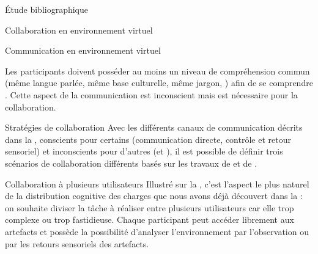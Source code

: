 \documentclass[myfrancais,ngerman,english,french]{mythesis}
\begin{document}
\begin{mychapter}{Étude bibliographique}
\begin{mysection}{Collaboration en environnement virtuel}
\begin{mysubsection}{Communication en environnement virtuel}
				\begin{mysubsubsection}{\myGrounding}
					Les participants doivent posséder au moins un niveau de compréhension commun (même langue parlée, même base culturelle, même jargon, \myetc) afin de se comprendre .
					Cette aspect de la communication est inconscient mais est nécessaire pour la collaboration.
				\end{mysubsubsection}
			\end{mysubsection}
			\begin{mysubsection}{Stratégies de collaboration}
				Avec les différents canaux de communication décrits dans la , conscients pour certains (communication directe, contrôle et retour sensoriel) et inconscients pour d'autres (\myfeedthrough et \mygrounding), il est possible de définir trois scénarios de collaboration différents basés sur les travaux de  et de .
				\begin{mysubsubsection}{Collaboration à plusieurs utilisateurs}
					Illustré sur la , c'est l'aspect le plus naturel de la distribution cognitive des charges que nous avons déjà découvert dans la  : on souhaite diviser la tâche à réaliser entre plusieurs utilisateurs car elle trop complexe ou trop fastidieuse.
					Chaque participant peut accéder librement aux artefacts et possède la possibilité d'analyser l'environnement par l'observation ou par les retours sensoriels des artefacts.


\end{mysubsubsection}
\end{mysubsection}
\end{mysection}
\end{mychapter}
\end{document}
